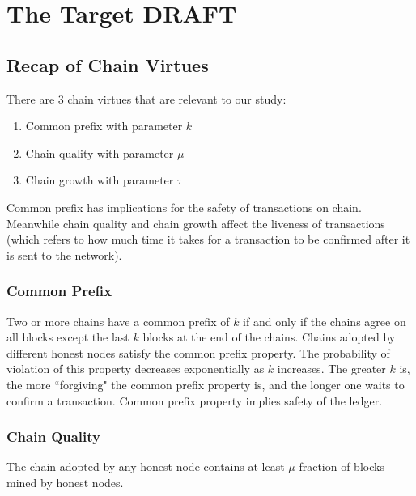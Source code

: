 \chapter{The Target \small{\textsf{DRAFT}}}

\section{Recap of Chain Virtues}
There are 3 chain virtues that are relevant to our study:

\begin{enumerate}
    \item Common prefix with parameter $k$
    \item Chain quality with parameter $\mu$
    \item Chain growth with parameter $\tau$
\end{enumerate}


Common prefix has implications for the safety of transactions on chain. Meanwhile chain quality and chain growth affect the liveness of transactions (which refers to how much time it takes for a transaction to be confirmed after it is sent to the network).

\subsection{Common Prefix}

Two or more chains have a common prefix of $k$ if and only if the chains agree on all blocks except the last $k$ blocks at the end of the chains.
Chains adopted by different honest nodes satisfy the common prefix property.
The probability of violation of this property decreases exponentially as $k$ increases. The greater $k$ is, the more ``forgiving" the common prefix property is, and the longer one waits to confirm a transaction.
Common prefix property implies safety of the ledger.

\subsection{Chain Quality}
The chain adopted by any honest node contains at least $\mu$ fraction of blocks mined by honest nodes.

